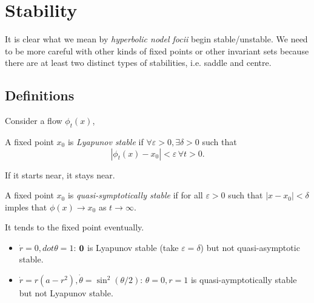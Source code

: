 \documentclass[a4paper]{article}
\begin{document}
\maketitle

\section{Stability}

It is clear what we mean by \emph{hyperbolic nodel focii} begin stable/unstable. We need to be more careful with other kinds of fixed points or other invariant sets because there are at least two distinct types of stabilities, i.e. saddle and centre.

\subsection{Definitions}

Consider a flow \(\phi_t(x)\),
\begin{defi}
 A fixed point \(x_0\) is \emph{Lyapunov stable} if \(\forall\varepsilon>0, \exists\delta>0\) such that
\[
  |\phi_t(x)-x_0| < \varepsilon \, \forall t>0.
\]
\end{defi}

\begin{slogan}
  If it starts near, it stays near.
\end{slogan}

\begin{defi}
  A fixed point \(x_0\) is \emph{quasi-symptotically stable} if for all \(\varepsilon>0\) such that \(|x-x_0|<\delta\) imples that \(\phi(x)\to x_0\) as \(t\to \infty\).
\end{defi}

\begin{slogan}
  It tends to the fixed point eventually.
\end{slogan}

\begin{eg}\leavevmode
  \begin{itemize}
  \item \(\dot r = 0, dot \theta = 1\): \(\mathbf{0}\) is Lyapunov stable (take \(\varepsilon = \delta\)) but not quasi-asymptotic stable.
  \item \(\dot r = r(a-r^2), \dot \theta = \sin^2(\theta/2)\): \(\theta=0,r=1\) is quasi-aymptotically stable but not Lyapunov stable.
  \end{itemize}
\end{eg}
    
\end{document}

